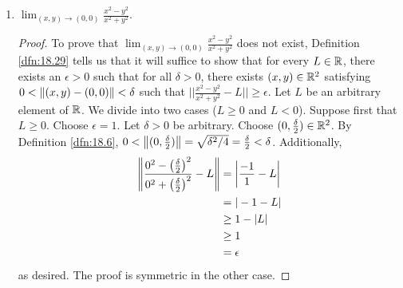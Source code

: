 \documentclass[../main.tex]{subfiles}
\begin{document}
\begin{exercise}
\begin{enumerate}[label={(\alph*)},ref={\theexercise\alph*}]
\begin{proof}
\begin{align*}
                &= \frac{2\epsilon}{3}
            \end{align*}\par
            Therefore, combining the last two results, we have that
            \begin{align*}
                \left| \frac{x^3-y^3}{x^2+y^2} \right| &= \left| \frac{(x-y)(x^2+xy+y^2)}{x^2+y^2} \right|\\
                &= |x-y|\cdot\left| \frac{xy}{x^2+y^2}+1 \right|\\
                &\leq |x-y|\cdot\left| \frac{xy}{x^2+y^2} \right|+|x-y|\tag*{Lemma \ref{lem:8.8}}\\
                &< \frac{2\epsilon}{3}\cdot\frac{1}{2}+\frac{2\epsilon}{3}\\
                &= \epsilon
            \end{align*}
            as desired.
        \end{proof}
        \item \label{exr:18.30c}$\lim_{(x,y)\to(0,0)}\frac{x^2-y^2}{x^2+y^2}$.
        \begin{proof}
            To prove that $\lim_{(x,y)\to(0,0)}\frac{x^2-y^2}{x^2+y^2}$ does not exist, Definition \ref{dfn:18.29} tells us that it will suffice to show that for every $L\in\mathbb{R}$, there exists an $\epsilon>0$ such that for all $\delta>0$, there exists $(x,y)\in\mathbb{R}^2$ satisfying $0<\norm{(x,y)-(0,0)}<\delta$ such that $||\frac{x^2-y^2}{x^2+y^2}-L||\geq\epsilon$. Let $L$ be an arbitrary element of $\mathbb{R}$. We divide into two cases ($L\geq 0$ and $L<0$). Suppose first that $L\geq 0$. Choose $\epsilon=1$. Let $\delta>0$ be arbitrary. Choose $(0,\frac{\delta}{2})\in\mathbb{R}^2$. By Definition \ref{dfn:18.6}, $0<\norm{(0,\frac{\delta}{2})}=\sqrt{\delta^2/4}=\frac{\delta}{2}<\delta$. Additionally,
            \begin{align*}
                \norm{\frac{0^2-\left( \frac{\delta}{2} \right)^2}{0^2+\left( \frac{\delta}{2} \right)^2}-L} &= \left| \frac{-1}{1}-L \right|\\
                &= |-1-L|\\
                &\geq 1-|L|\\
                &\geq 1\\
                &= \epsilon
            \end{align*}
            as desired. The proof is symmetric in the other case.
        \end{proof}
    \end{enumerate}
\end{exercise}
\end{document}
